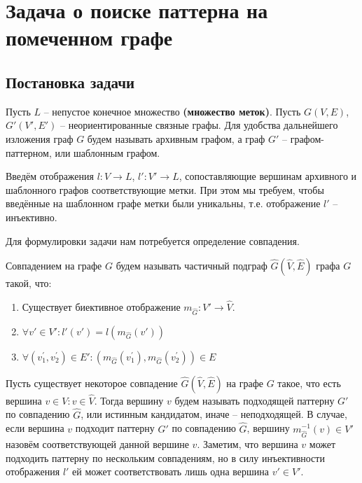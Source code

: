 \section{Задача о поиске паттерна на помеченном графе}

\subsection{Постановка задачи}
\par Пусть $L$ -- непустое конечное множество \textbf{(множество меток)}. Пусть $G(V, E)$, $G'(V', E')$ -- неориентированные связные графы. Для удобства дальнейшего изложения граф $G$ будем называть архивным графом, а граф $G'$ -- графом-паттерном, или шаблонным графом.

Введём отображения $l : V \to L$, $l' : V' \to L$, сопоставляющие вершинам архивного и шаблонного графов соответствующие метки. При этом мы требуем, чтобы введённые на шаблонном графе метки были уникальны, т.е. отображение $l'$ -- инъективно. 

Для формулировки задачи нам потребуется определение совпадения.

\begin{defn}
	Совпадением на графе $G$ будем называть частичный подграф $\widehat{G}(\widehat{V}, \widehat{E})$ графа $G$ такой, что:
	\begin{enumerate}
		\item Существует биективное отображение $m_{\widehat{G}}: V' \to \widehat{V}$.
		\item $\forall v' \in V': l'(v') = l(m_{\widehat{G}}(v'))$
		\item $\forall (v^{\prime}_1, v^{\prime}_2) \in E': (m_{\widehat{G}}(v^{\prime}_1), m_{\widehat{G}}(v^{\prime}_2)) \in E$
	\end{enumerate}
\end{defn} 

Пусть существует некоторое совпадение  $\widehat{G}(\widehat{V}, \widehat{E})$ на графе $G$ такое, что есть вершина $v \in V : v \in \widehat{V}$. Тогда вершину $v$ будем называть подходящей паттерну $G'$ по совпадению $\widehat{G}$, или истинным кандидатом, иначе -- неподходящей. В случае, если вершина $v$ подходит паттерну $G'$ по совпадению $\widehat{G}$, вершину $m_{\widehat{G}}^{-1}(v) \in  V'$ назовём соответствующей данной вершине $v$. Заметим, что вершина $v$ может подходить паттерну по нескольким совпадениям, но в силу инъективности отображения $l'$ ей может соответствовать лишь одна вершина $v' \in  V'$.

